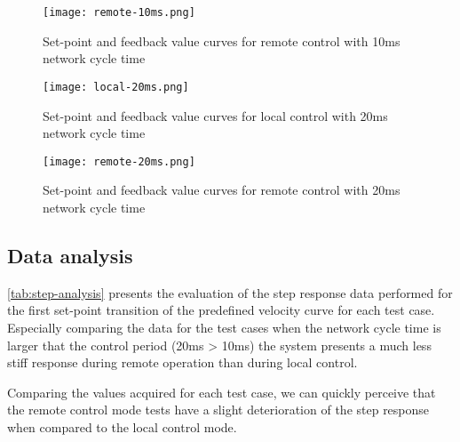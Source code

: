 \begin{figure}[H]
	\centering
	\texttt{[image: remote-10ms.png]}
	\caption{Set-point and feedback value curves for remote control with 10ms network cycle time}
	\label{fig:remote-10ms}
\end{figure}

\clearpage
\begin{figure}[H]
	\centering
	\texttt{[image: local-20ms.png]}
	\caption{Set-point and feedback value curves for local control with 20ms network cycle time}
	\label{fig:local-20ms}
\end{figure}

\begin{figure}[H]
	\centering
	\texttt{[image: remote-20ms.png]}
	\caption{Set-point and feedback value curves for remote control with 20ms network cycle time}
	\label{fig:remote-20ms}
\end{figure}

\clearpage
\subsection{Data analysis}

\autoref{tab:step-analysis} presents the evaluation of the step response data performed for the first set-point transition of the predefined velocity curve for each test case.
Especially comparing the data for the test cases when the network cycle time is larger that the control period (20ms > 10ms) the system presents a much less stiff response during remote operation than during local control.

Comparing the values acquired for each test case, we can quickly perceive that the remote control mode tests have a slight deterioration of the step response when compared to the local control mode.

